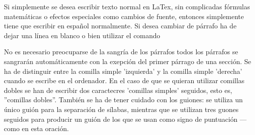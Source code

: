 \documentclass[a4paper,10pt]{letter}
\begin{document}
Si simplemente se desea escribir texto normal en LaTex,
sin complicadas fórmulas matemáticas o efectos especiales
como cambios de fuente, entonces simplemente tiene que escribir
en español normalmente.
Si desea cambiar de párrafo ha de dejar una línea en blanco o bien
utilizar el comando \par
No es necesario preocuparse de la sangría de los párrafos
todos los párrafos se sangrarán automáticamente con la exepción
del primer párrago de una sección.
Se ha de distinguir entre la comilla simple 'izquierda'
y la comilla simple 'derecha' cuando se escribe en el ordenador.
En el caso de que se quieran utilizar comillas dobles se han de 
escribir dos caractecres 'comillas simples' seguidos, esto es,
''comillas dobles''.
También se ha de tener cuidado con los guiones: se utiliza un único
guión para la separación de sílabas, mientras que se utilizan
tres guones seguidos para producir un guión de los que se usan
como signo de puntuación --- como en esta oración.
\end{document}
